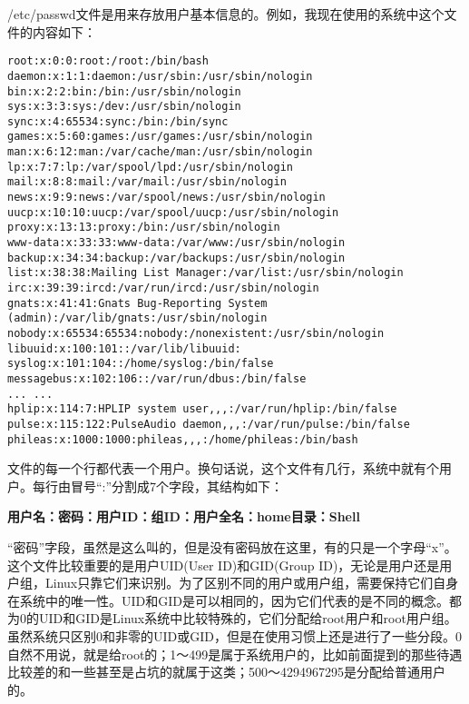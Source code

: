 /etc/passwd文件是用来存放用户基本信息的。例如，我现在使用的系统中这个文件的内容如下：
\begin{verbatim}
root:x:0:0:root:/root:/bin/bash
daemon:x:1:1:daemon:/usr/sbin:/usr/sbin/nologin
bin:x:2:2:bin:/bin:/usr/sbin/nologin
sys:x:3:3:sys:/dev:/usr/sbin/nologin
sync:x:4:65534:sync:/bin:/bin/sync
games:x:5:60:games:/usr/games:/usr/sbin/nologin
man:x:6:12:man:/var/cache/man:/usr/sbin/nologin
lp:x:7:7:lp:/var/spool/lpd:/usr/sbin/nologin
mail:x:8:8:mail:/var/mail:/usr/sbin/nologin
news:x:9:9:news:/var/spool/news:/usr/sbin/nologin
uucp:x:10:10:uucp:/var/spool/uucp:/usr/sbin/nologin
proxy:x:13:13:proxy:/bin:/usr/sbin/nologin
www-data:x:33:33:www-data:/var/www:/usr/sbin/nologin
backup:x:34:34:backup:/var/backups:/usr/sbin/nologin
list:x:38:38:Mailing List Manager:/var/list:/usr/sbin/nologin
irc:x:39:39:ircd:/var/run/ircd:/usr/sbin/nologin
gnats:x:41:41:Gnats Bug-Reporting System (admin):/var/lib/gnats:/usr/sbin/nologin
nobody:x:65534:65534:nobody:/nonexistent:/usr/sbin/nologin
libuuid:x:100:101::/var/lib/libuuid:
syslog:x:101:104::/home/syslog:/bin/false
messagebus:x:102:106::/var/run/dbus:/bin/false
... ...
hplip:x:114:7:HPLIP system user,,,:/var/run/hplip:/bin/false
pulse:x:115:122:PulseAudio daemon,,,:/var/run/pulse:/bin/false
phileas:x:1000:1000:phileas,,,:/home/phileas:/bin/bash
\end{verbatim}

文件的每一个行都代表一个用户。换句话说，这个文件有几行，系统中就有个用户。每行由冒号“:”分割成7个字段，其结构如下：

\centerline{\textbf{用户名：密码：用户ID：组ID：用户全名：home目录：Shell}}

“密码”字段，虽然是这么叫的，但是没有密码放在这里，有的只是一个字母“x”。这个文件比较重要的是用户UID(User ID)和GID(Group ID)，无论是用户还是用户组，Linux只靠它们来识别。为了区别不同的用户或用户组，需要保持它们自身在系统中的唯一性。UID和GID是可以相同的，因为它们代表的是不同的概念。都为0的UID和GID是Linux系统中比较特殊的，它们分配给root用户和root用户组。虽然系统只区别0和非零的UID或GID，但是在使用习惯上还是进行了一些分段。0自然不用说，就是给root的；1～499是属于系统用户的，比如前面提到的那些待遇比较差的和一些甚至是占坑的就属于这类；500～4294967295是分配给普通用户的。


